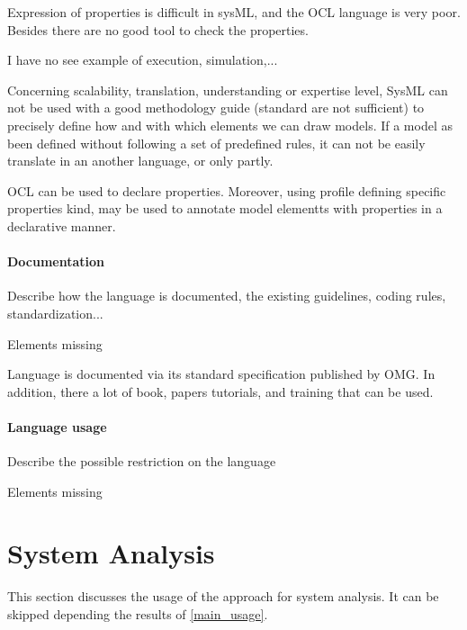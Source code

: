 \begin{assessor2}
Expression of properties is difficult in sysML, and the OCL language is very poor. Besides there are no good tool to check the properties. 

I have no see example of execution, simulation,...

Concerning scalability, translation, understanding or expertise level, SysML can not be used with a good methodology guide (standard are not sufficient)  to  precisely define how and with which elements we can draw models. If a model as been defined without following a set of predefined rules, it can not be easily translate in an another language, or only  partly.
\end{assessor2}

\begin{author_comment}
OCL can be used to declare properties. Moreover, using profile defining specific properties kind, may be used to annotate model elementts with properties in a declarative manner.
\end{author_comment}

\paragraph{Documentation} Describe how the language is documented, the existing guidelines, coding rules, standardization...


\begin{assessor2}
Elements missing
\end{assessor2}

\begin{author_comment}
Language is documented via its standard specification published by OMG. In addition, there a lot of book, papers tutorials, and training that can be used.
\end{author_comment}


\paragraph{Language usage} Describe the possible restriction on the language


\begin{assessor2}
Elements missing
\end{assessor2}



\section{System Analysis}
This section discusses the usage of the approach for system analysis.
It can be skipped depending the results of \ref{main_usage}.

